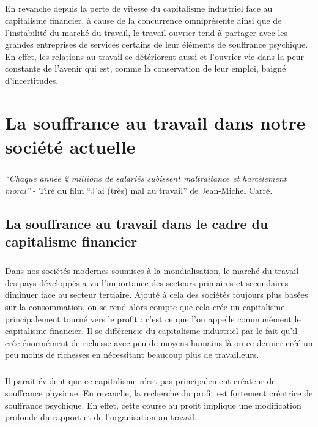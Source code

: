 \documentclass{report}
\begin{document}
		\paragraph{}
			En revanche depuis la perte de vitesse du capitalisme industriel face au capitalisme financier, à cause de la concurrence omniprésente ainsi que de l'instabilité du marché du travail, le travail ouvrier tend à partager avec les grandes entreprises de services certains de leur éléments de souffrance psychique. En effet, les relations au travail se détériorent aussi et l'ouvrier vie dans la peur constante de l'avenir qui est, comme la conservation de leur emploi, baigné d'incertitudes.

\chapter{La souffrance au travail dans notre société actuelle}
	\paragraph{}
		\textit{``Chaque année 2 millions de salariés subissent maltraitance et harcèlement moral''} - Tiré du film ``J’ai (très) mal au travail'' de Jean-Michel Carré.
	\section{La souffrance au travail dans le cadre du capitalisme financier}
		\paragraph{}
			Dans nos sociétés modernes soumises à la mondialisation, le marché du travail des pays développés a vu l'importance des secteurs primaires et secondaires diminuer face au secteur tertiaire. Ajouté à cela des sociétés toujours plus basées sur la consommation, on se rend alors compte que cela crée un capitalisme principalement tourné vers le profit : c'est ce que l'on appelle communément le capitalisme financier. Il se différencie du capitalisme industriel par le fait qu'il crée énormément de richesse avec peu de moyens humains là ou ce dernier créé un peu moins de richesses en nécessitant beaucoup plus de travailleurs.
		\paragraph{}
			Il parait évident que ce capitalisme n'est pas principalement créateur de souffrance physique. En revanche, la recherche du profit est fortement créatrice de souffrance psychique. En effet, cette course au profit implique une modification profonde du rapport et de l'organisation au travail.
\end{document}
